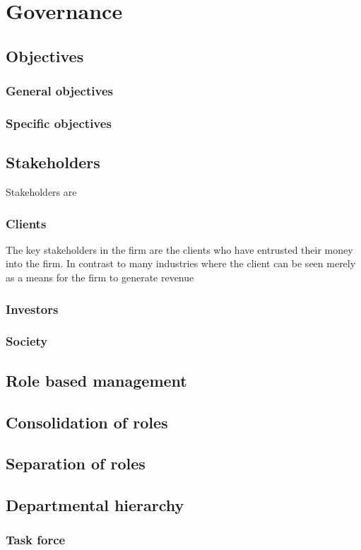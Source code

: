 \chapter{Governance}

\section{Objectives}

\subsection{General objectives}

\subsection{Specific objectives}

\section{Stakeholders}
Stakeholders are

\subsection{Clients}

The key stakeholders in the firm are the clients who have entrusted
their money into the firm.  In contrast to many industries where the
client can be seen merely as a means for the firm to generate revenue

\subsection{Investors}

\subsection{Society}

\section{Role based management}


\section{Consolidation of roles}

\section{Separation of roles}

\section{Departmental hierarchy}

\subsection{Task force}



